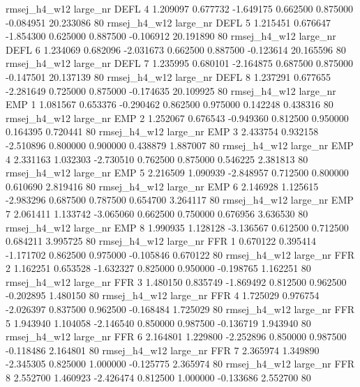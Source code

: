 rmsej_h4_w12   large_nr     DEFL                 4  1.209097  0.677732  -1.649175 0.662500 0.875000 -0.084951   20.233086 80
rmsej_h4_w12   large_nr     DEFL                 5  1.215451  0.676647  -1.854300 0.625000 0.887500 -0.106912   20.191890 80
rmsej_h4_w12   large_nr     DEFL                 6  1.234069  0.682096  -2.031673 0.662500 0.887500 -0.123614   20.165596 80
rmsej_h4_w12   large_nr     DEFL                 7  1.235995  0.680101  -2.164875 0.687500 0.875000 -0.147501   20.137139 80
rmsej_h4_w12   large_nr     DEFL                 8  1.237291  0.677655  -2.281649 0.725000 0.875000 -0.174635   20.109925 80
rmsej_h4_w12   large_nr      EMP                 1  1.081567  0.653376  -0.290462 0.862500 0.975000  0.142248    0.438316 80
rmsej_h4_w12   large_nr      EMP                 2  1.252067  0.676543  -0.949360 0.812500 0.950000  0.164395    0.720441 80
rmsej_h4_w12   large_nr      EMP                 3  2.433754  0.932158  -2.510896 0.800000 0.900000  0.438879    1.887007 80
rmsej_h4_w12   large_nr      EMP                 4  2.331163  1.032303  -2.730510 0.762500 0.875000  0.546225    2.381813 80
rmsej_h4_w12   large_nr      EMP                 5  2.216509  1.090939  -2.848957 0.712500 0.800000  0.610690    2.819416 80
rmsej_h4_w12   large_nr      EMP                 6  2.146928  1.125615  -2.983296 0.687500 0.787500  0.654700    3.264117 80
rmsej_h4_w12   large_nr      EMP                 7  2.061411  1.133742  -3.065060 0.662500 0.750000  0.676956    3.636530 80
rmsej_h4_w12   large_nr      EMP                 8  1.990935  1.128128  -3.136567 0.612500 0.712500  0.684211    3.995725 80
rmsej_h4_w12   large_nr      FFR                 1  0.670122  0.395414  -1.171702 0.862500 0.975000 -0.105846    0.670122 80
rmsej_h4_w12   large_nr      FFR                 2  1.162251  0.653528  -1.632327 0.825000 0.950000 -0.198765    1.162251 80
rmsej_h4_w12   large_nr      FFR                 3  1.480150  0.835749  -1.869492 0.812500 0.962500 -0.202895    1.480150 80
rmsej_h4_w12   large_nr      FFR                 4  1.725029  0.976754  -2.026397 0.837500 0.962500 -0.168484    1.725029 80
rmsej_h4_w12   large_nr      FFR                 5  1.943940  1.104058  -2.146540 0.850000 0.987500 -0.136719    1.943940 80
rmsej_h4_w12   large_nr      FFR                 6  2.164801  1.229800  -2.252896 0.850000 0.987500 -0.118486    2.164801 80
rmsej_h4_w12   large_nr      FFR                 7  2.365974  1.349890  -2.345305 0.825000 1.000000 -0.125775    2.365974 80
rmsej_h4_w12   large_nr      FFR                 8  2.552700  1.460923  -2.426474 0.812500 1.000000 -0.133686    2.552700 80
